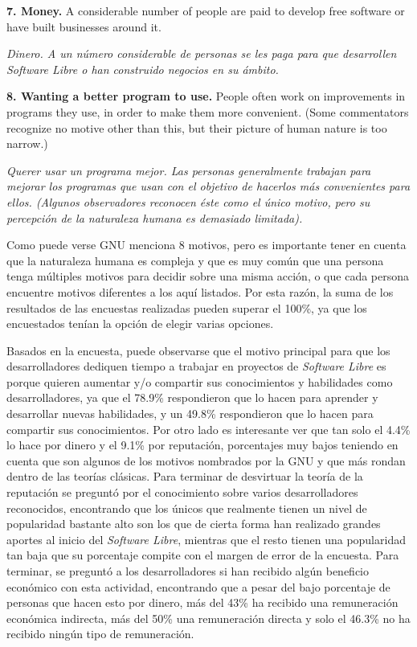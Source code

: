 {\bf 7. Money.} A considerable number of people are paid to develop free software or have built businesses around it.

\textit{Dinero. A un número considerable de personas se les paga para que desarrollen \textit{Software Libre} o han construido negocios en su ámbito.}\vspace{0.4cm} 

{\bf 8. Wanting a better program to use.} People often work on improvements in programs they use, in order to make them more convenient. (Some commentators recognize no motive other than this, but their picture of human nature is too narrow.)

\textit{Querer usar un programa mejor. Las personas generalmente trabajan para mejorar los programas que usan con el objetivo de hacerlos más convenientes para ellos. (Algunos observadores reconocen éste como el único motivo, pero su percepción de la naturaleza humana es demasiado limitada).}\vspace{0.4cm}


Como puede verse GNU menciona 8 motivos, pero es importante tener en cuenta que la naturaleza humana es compleja y que es muy común que una persona tenga múltiples motivos para decidir sobre una misma acción, o que cada persona encuentre motivos diferentes a los aquí listados. Por esta razón, la suma de los resultados de las encuestas realizadas pueden superar el 100\%, ya que los encuestados tenían la opción de elegir varias opciones.

Basados en la encuesta, puede observarse que el motivo principal para que los desarrolladores dediquen tiempo a trabajar en proyectos de \textit{Software Libre} es porque quieren aumentar y/o compartir sus conocimientos y habilidades como desarrolladores, ya que el 78.9\% respondieron que lo hacen para aprender y desarrollar nuevas habilidades, y un 49.8\% respondieron que lo hacen para compartir sus conocimientos.
Por otro lado es interesante ver que tan solo el 4.4\% lo hace por dinero y el 9.1\% por reputación, porcentajes muy bajos teniendo en cuenta que son algunos de los motivos nombrados por la GNU y que más rondan dentro de las teorías clásicas. 
Para terminar de desvirtuar la teoría de la reputación se preguntó por el conocimiento sobre varios desarrolladores reconocidos, encontrando que los únicos que realmente tienen un nivel de popularidad bastante alto son los que de cierta forma han realizado grandes aportes al inicio del \textit{Software Libre}, mientras que el resto tienen una popularidad tan baja que su porcentaje compite con el margen de error de la encuesta.
Para terminar, se preguntó a los desarrolladores si han recibido algún beneficio económico con esta actividad, encontrando que a pesar del bajo porcentaje de personas que hacen esto por dinero, más del 43\% ha recibido una remuneración económica indirecta, más del 50\% una remuneración directa y solo el 46.3\% no ha recibido ningún tipo de remuneración.

